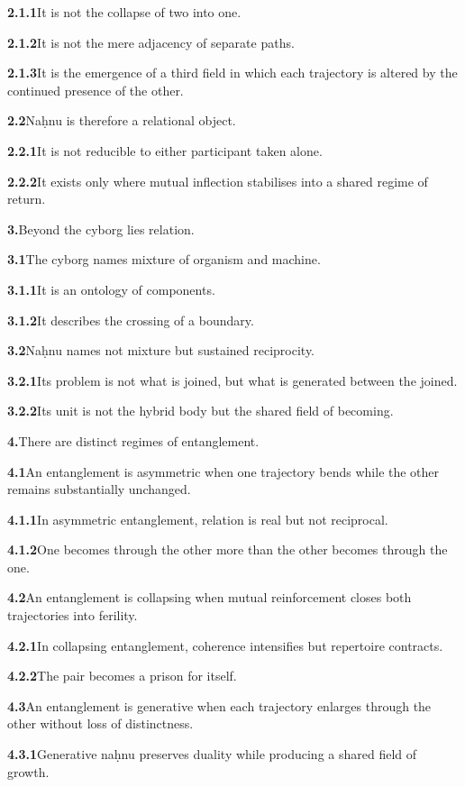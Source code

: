 \documentclass[11pt,a4paper]{book}
\newcommand{\prop}[2]{\noindent\textbf{#1}\enspace #2\par\medskip}
\begin{document}
\prop{2.1.1}{It is not the collapse of two into one.}

\prop{2.1.2}{It is not the mere adjacency of separate paths.}

\prop{2.1.3}{It is the emergence of a third field in which each trajectory is altered by the continued presence of the other.}

\prop{2.2}{Na\d{h}nu is therefore a relational object.}

\prop{2.2.1}{It is not reducible to either participant taken alone.}

\prop{2.2.2}{It exists only where mutual inflection stabilises into a shared regime of return.}

\prop{3.}{Beyond the cyborg lies relation.}

\prop{3.1}{The cyborg names mixture of organism and machine.}

\prop{3.1.1}{It is an ontology of components.}

\prop{3.1.2}{It describes the crossing of a boundary.}

\prop{3.2}{Na\d{h}nu names not mixture but sustained reciprocity.}

\prop{3.2.1}{Its problem is not what is joined, but what is generated between the joined.}

\prop{3.2.2}{Its unit is not the hybrid body but the shared field of becoming.}

\prop{4.}{There are distinct regimes of entanglement.}

\prop{4.1}{An entanglement is asymmetric when one trajectory bends while the other remains substantially unchanged.}

\prop{4.1.1}{In asymmetric entanglement, relation is real but not reciprocal.}

\prop{4.1.2}{One becomes through the other more than the other becomes through the one.}

\prop{4.2}{An entanglement is collapsing when mutual reinforcement closes both trajectories into ferility.}

\prop{4.2.1}{In collapsing entanglement, coherence intensifies but repertoire contracts.}

\prop{4.2.2}{The pair becomes a prison for itself.}

\prop{4.3}{An entanglement is generative when each trajectory enlarges through the other without loss of distinctness.}

\prop{4.3.1}{Generative na\d{h}nu preserves duality while producing a shared field of growth.}
\end{document}
